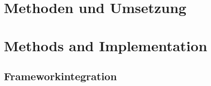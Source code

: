 {\chapter{Methoden und Umsetzung}}
{\chapter{Methods and Implementation}}
\label{sec:methods}


\section{Frameworkintegration}

